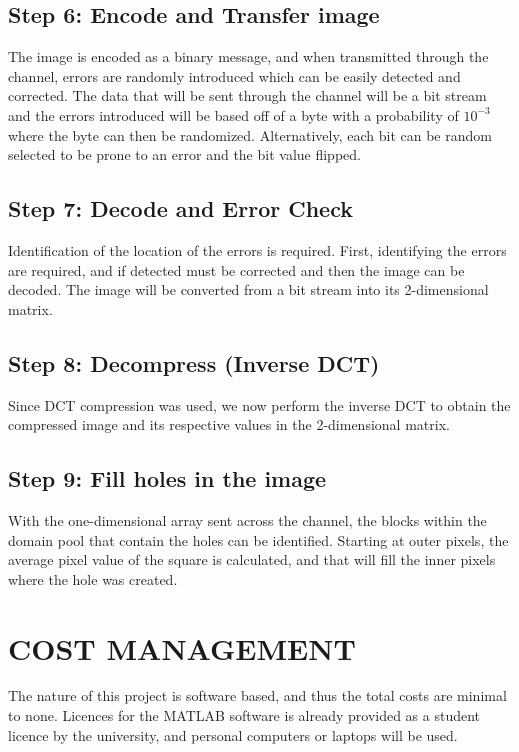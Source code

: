 \documentclass[10pt,twocolumn]{witseiepaper}
\begin{document}
\subsection{Step 6: Encode and Transfer image}
\label{sec: Step 6}
The image is encoded as a binary message, and when transmitted through the channel, errors are randomly introduced which can be easily detected and corrected. The data that will be sent through the channel will be a bit stream and the errors introduced will be based off of a byte with a probability of $10^{-3}$ where the byte can then be randomized. Alternatively, each bit can be random selected to be prone to an error and the bit value flipped. 

\subsection{Step 7: Decode and Error Check}
\label{sec: Step 7}
Identification of the location of the errors is required. First, identifying the errors are required, and if detected must be corrected and then the image can be decoded. The image will be converted from a bit stream into its 2-dimensional matrix.

\subsection{Step 8: Decompress (Inverse DCT)}
\label{sec: Step 8}
Since DCT compression was used, we now perform the inverse DCT to obtain the compressed image and its respective values in the 2-dimensional matrix.

\subsection{Step 9: Fill holes in the image}
\label{sec: Step 9}
With the one-dimensional array sent across the channel, the blocks within the domain pool that contain the holes can be identified. Starting at outer pixels, the average pixel value of the square is calculated, and that will fill the inner pixels where the hole was created.

%
\section{COST MANAGEMENT}
\label{sec: Cost Management}
The nature of this project is software based, and thus the total costs are minimal to none. Licences for the MATLAB software is already provided as a student licence by the university, and personal computers or laptops will be used.
\end{document}

